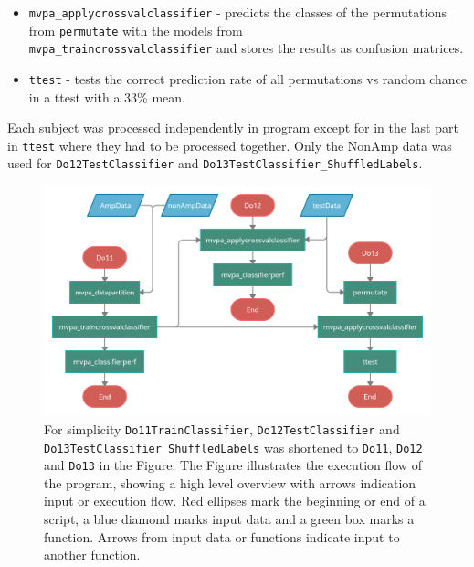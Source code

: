 \documentclass[12pt, a4paper]{article}
\begin{document}
\begin{itemize}
\begin{itemize}
        \item \texttt{mvpa\_applycrossvalclassifier} - predicts the classes of the permutations from \texttt{permutate} with the models from \\\texttt{mvpa\_traincrossvalclassifier} and stores the results as confusion matrices.
        
        \item \texttt{ttest} - tests the correct prediction rate of all permutations vs random chance in a ttest with a 33\% mean.
    \end{itemize}
\end{itemize}

Each subject was processed independently in program except for in the last part in \texttt{ttest} where they had to be processed together.
Only the NonAmp data was used for \texttt{Do12TestClassifier} and \texttt{Do13TestClassifier\_ShuffledLabels}.


\begin{figure}[H]
    \centering
    \includegraphics[width=1.0\textwidth, ]{pictures/General structure Master Thesis.png}
    \caption{For simplicity \texttt{Do11TrainClassifier}, \texttt{Do12TestClassifier} and \texttt{Do13TestClassifier\_ShuffledLabels} was shortened to \texttt{Do11}, \texttt{Do12} and \texttt{Do13} in the Figure.
    The Figure illustrates the execution flow of the program, showing a high level overview with arrows indication input or execution flow.
    Red ellipses mark the beginning or end of a script, a blue diamond marks input data and a green box marks a function.
    Arrows from input data or functions indicate input to another function.}
    \label{fig:GeneralProgramStructure}
\end{figure}

\end{document}
